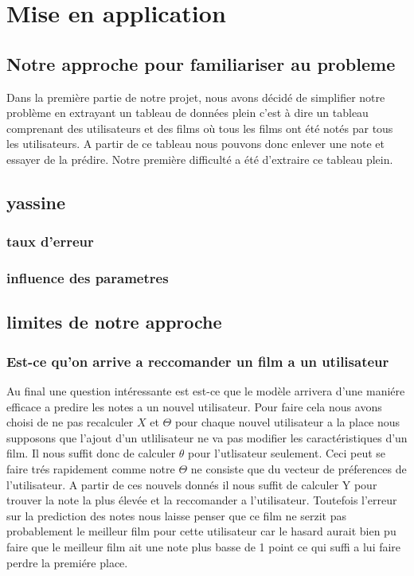 \documentclass[a4paper,10pt]{article}
\begin{document}
\section{Mise en application}
\subsection{Notre approche pour familiariser au probleme}
Dans la première partie de notre projet, nous avons décidé de simplifier notre problème en extrayant un tableau de données 
plein c'est à dire un tableau comprenant des utilisateurs et des films où tous les films ont été notés par tous les utilisateurs. 
A partir de ce tableau nous pouvons donc enlever une note et essayer de la prédire. 
Notre première difficulté a été d'extraire ce tableau plein.
\subsection{yassine}
\subsubsection{taux d'erreur}
\subsubsection{influence des parametres}
\subsection{limites de notre approche}
\subsubsection{Est-ce qu'on arrive a reccomander un film a un utilisateur}
Au final une question intéressante est est-ce que le modèle arrivera d'une maniére efficace a predire les notes a un nouvel utilisateur. Pour faire cela nous avons
choisi de ne pas recalculer $X$ et $\Theta$ pour chaque nouvel utilisateur a la place nous supposons que l'ajout d'un utlilisateur ne va pas modifier
les caractéristiques d'un film. Il nous suffit donc de calculer $\theta$ pour l'utlisateur seulement. Ceci peut se faire trés rapidement comme notre $\Theta$ ne
consiste que du vecteur de préferences de l'utilisateur. A partir de ces nouvels donnés il nous suffit de calculer Y pour trouver la note la plus élevée et la reccomander
a l'utilisateur. Toutefois l'erreur sur la prediction des notes nous laisse penser que ce film ne serzit pas probablement le meilleur film
pour cette utilisateur car le hasard aurait bien pu faire que le meilleur film ait une note plus basse de 1 point ce qui suffi a lui faire perdre la premiére place.
\end{document}
